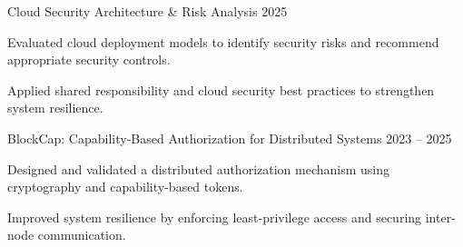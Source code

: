 \begin{cventries}
  \cventry
    {Cloud Security Architecture \& Risk Analysis}
    {2025}
    {
      \begin{cvitems}
        \item {Evaluated cloud deployment models to identify security risks and recommend appropriate security controls.}
        \item {Applied shared responsibility and cloud security best practices to strengthen system resilience.}
      \end{cvitems}
    }
    \vspace{4mm}

  \cventry
    {BlockCap: Capability-Based Authorization for Distributed Systems}
    {2023 -- 2025}
    {
      \begin{cvitems}
        \item {Designed and validated a distributed authorization mechanism using cryptography and capability-based tokens.}
        \item {Improved system resilience by enforcing least-privilege access and securing inter-node communication.}
      \end{cvitems}
    }

\end{cventries}

\vspace{4mm}